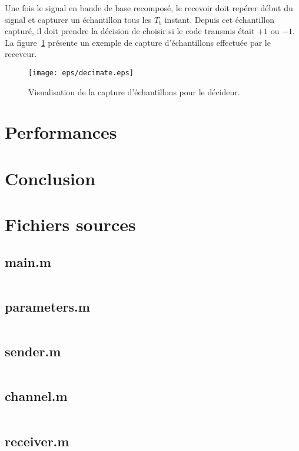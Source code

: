 \documentclass[10pt, oneside, a4paper]{article}
\begin{document}
Une fois le signal en bande de base recomposé, le recevoir doit repérer début du signal et capturer un échantillon tous les $T_b$ instant.
Depuis cet échantillon capturé, il doit prendre la décision de choisir si le code transmis était $+1$ ou $-1$.
La figure~\ref{fig:decimate} présente un exemple de capture d'échantillons effectuée par le receveur.

\begin{figure}[htbp]
	\centering
	\texttt{[image: eps/decimate.eps]}
	\caption{Visualisation de la capture d'échantillons pour le décideur.}
	\label{fig:decimate}
\end{figure}


\section{Performances}


\section{Conclusion}

\appendix
\clearpage

\section{Fichiers sources}
\label{sec:fichiers-sources}

\subsection{main.m}
\inputminted{matlab}{../main.m}
\label{app:main}

\subsection{parameters.m}
\inputminted{matlab}{../parameters.m}
\label{app:paremeters}

\subsection{sender.m}
\inputminted{matlab}{../sender.m}
\label{app:sender}

\subsection{channel.m}
\inputminted{matlab}{../channel.m}
\label{app:channel}

\subsection{receiver.m}
\inputminted{matlab}{../receiver.m}
\label{app:receiver}
\end{document}
